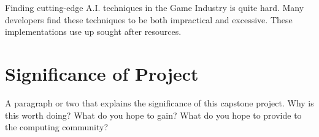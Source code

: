 Finding cutting-edge A.I. techniques in the Game Industry is quite hard. Many developers find these techniques to be both impractical and excessive. These implementations use up sought after resources. 







\section{Significance of Project} 

A paragraph or two that explains the significance of this capstone project. Why is this worth doing? What do you hope to gain? What do you hope to provide to the computing community?

